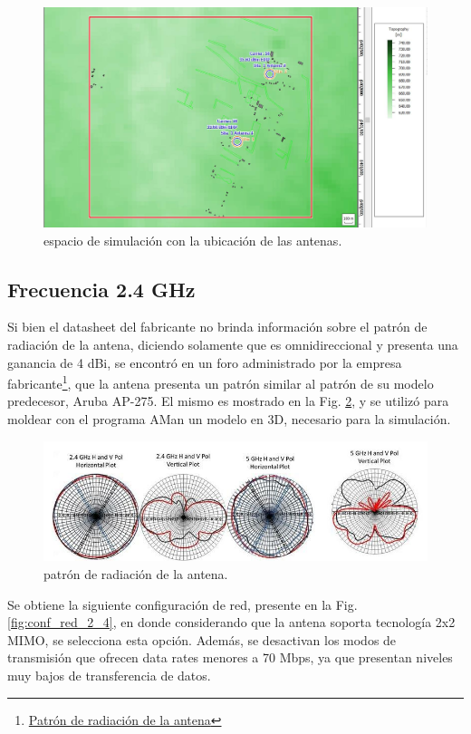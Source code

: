 \documentclass[11pt,a4paper]{article}
\begin{document}
\begin{figure}[htbp]
  \centering
  \includegraphics[width=0.75\linewidth]{fotos_ema/sim_ubic_antenas.jpg}
  \caption{espacio de simulación con la  ubicación de las antenas.}
  \label{fig:sim_ubic_antenas}
\end{figure}


\subsection{Frecuencia 2.4 GHz}

Si bien el datasheet del fabricante no brinda información sobre el patrón de radiación de la antena, diciendo solamente que es omnidireccional y presenta una ganancia de 4 dBi, se encontró en un foro administrado por la empresa fabricante\footnote{\href{https://community.arubanetworks.com/community-home/digestviewer/viewthread?MID=25688}{Patrón de radiación de la antena}}, que la antena presenta un patrón similar al patrón de su modelo predecesor, Aruba AP-275. 
El mismo es mostrado en la Fig. \ref{fig:patron_2_4_GHz}, y se utilizó para moldear con el programa AMan un modelo en 3D, necesario para la simulación. 

\begin{figure}[htbp]
  \centering
  \includegraphics[width=\linewidth]{fotos_ema/patron_2_4_GHz.jpg}
  \caption{patrón de radiación de la antena.}
  \label{fig:patron_2_4_GHz}
\end{figure}

Se obtiene la siguiente configuración de red, presente en la Fig. \ref{fig:conf_red_2_4}, en donde considerando que la antena soporta tecnología 2x2 MIMO, se selecciona esta opción. 
Además, se desactivan los modos de transmisión que ofrecen data rates menores a 70 Mbps, ya que presentan niveles muy bajos de transferencia de datos.
\end{document}
